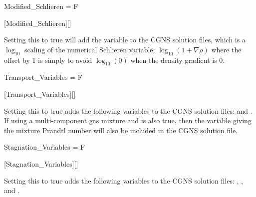
\begin{nmldescitem}
Modified_Schlieren = F
\end{nmldescitem}
[Modified\_Schlieren][]

\begin{nmldescbody}
Setting this to true will add the variable  to the
CGNS solution files, which is a $\log_{10}$ scaling of the numerical Schlieren
variable, \thatis $\log_{10}\left(1+\nabla\rho\right)$ where the offset by $1$
is simply to avoid $\log_{10}(0)$ when the density gradient is $0$.
\end{nmldescbody}


\begin{nmldescitem}
Transport_Variables = F
\end{nmldescitem}
[Transport\_Variables][]

\begin{nmldescbody}
Setting this to true adds the following variables to the CGNS solution files:
   and
  .
\\
If using a multi-component gas mixture and
is also true, then the variable
giving the mixture Prandtl number will also be included in the
CGNS solution file.
\end{nmldescbody}


\begin{nmldescitem}
Stagnation_Variables = F
\end{nmldescitem}
[Stagnation\_Variables][]

\begin{nmldescbody}
Setting this to true adds the following variables to the CGNS solution files:
  ,
  , and
  .
\end{nmldescbody}


